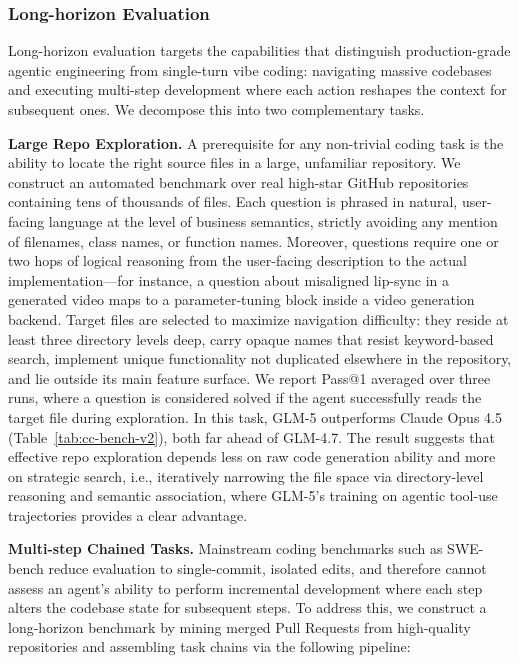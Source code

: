 \subsubsection{Long-horizon Evaluation}

Long-horizon evaluation targets the capabilities that distinguish production-grade agentic engineering from single-turn vibe coding: navigating massive codebases and executing multi-step development where each action reshapes the context for subsequent ones. We decompose this into two complementary tasks.

\textbf{Large Repo Exploration.} A prerequisite for any non-trivial coding task is the ability to locate the right source files in a large, unfamiliar repository. We construct an automated benchmark over real high-star GitHub repositories containing tens of thousands of files. Each question is phrased in natural, user-facing language at the level of business semantics, strictly avoiding any mention of filenames, class names, or function names. Moreover, questions require one or two hops of logical reasoning from the user-facing description to the actual implementation---for instance, a question about misaligned lip-sync in a generated video maps to a parameter-tuning block inside a video generation backend. Target files are selected to maximize navigation difficulty: they reside at least three directory levels deep, carry opaque names that resist keyword-based search, implement unique functionality not duplicated elsewhere in the repository, and lie outside its main feature surface. We report Pass@1 averaged over three runs, where a question is considered solved if the agent successfully reads the target file during exploration. In this task, GLM-5 outperforms Claude Opus 4.5 (Table~\ref{tab:cc-bench-v2}), both far ahead of GLM-4.7. The result suggests that effective repo exploration depends less on raw code generation ability and more on strategic search, i.e., iteratively narrowing the file space via directory-level reasoning and semantic association, where GLM-5's training on agentic tool-use trajectories provides a clear advantage.

\textbf{Multi-step Chained Tasks.} Mainstream coding benchmarks such as SWE-bench reduce evaluation to single-commit, isolated edits, and therefore cannot assess an agent's ability to perform incremental development where each step alters the codebase state for subsequent steps. To address this, we construct a long-horizon benchmark by mining merged Pull Requests from high-quality repositories and assembling task chains via the following pipeline:


